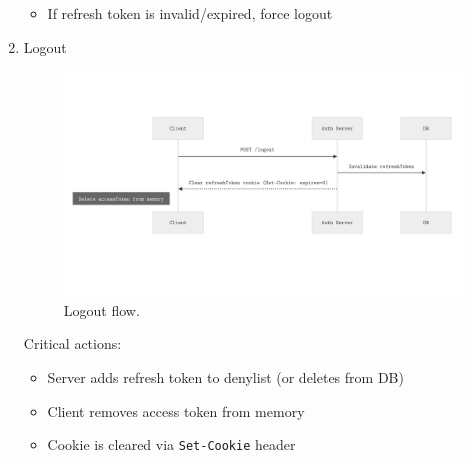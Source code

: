 \documentclass[a4paper,10pt]{article}
\begin{document}
\begin{enumerate}
\begin{itemize}
              \item If refresh token is invalid/expired, force logout
          \end{itemize}
    \item Logout
          \begin{figure}[H]
              \centering
              \includegraphics[width=\textwidth]{images/logout.png}
              \caption{Logout flow.}
              \label{fig:logout}
          \end{figure}

          Critical actions:

          \begin{itemize}
              \item Server adds refresh token to denylist (or deletes from DB)

              \item Client removes access token from memory

              \item Cookie is cleared via \texttt{Set-Cookie} header
          \end{itemize}
\end{enumerate}
\end{document}

